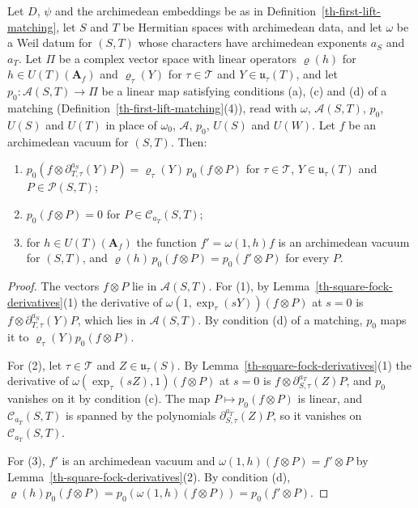 \begin{lemma}\label{th-square-fock-maps}
Let $D$, $\psi$ and the archimedean embeddings be as in
Definition~\ref{th-first-lift-matching}, let $S$ and $T$ be Hermitian spaces
with archimedean data, and let $\omega$ be a Weil datum for $(S,T)$ whose
characters have archimedean exponents $a_S$ and $a_T$. Let $\Pi$ be a complex
vector space with linear operators $\varrho(h)$ for $h\in U(T)(\mathbf A_f)$
and $\varrho_\tau(Y)$ for $\tau\in\mathcal T$ and $Y\in\mathfrak u_\tau(T)$,
and let $p_0\colon\mathcal A(S,T)\to\Pi$ be a linear map satisfying conditions
(a), (c) and (d) of a matching (Definition~\ref{th-first-lift-matching}(4)),
read with $\omega$, $\mathcal A(S,T)$, $p_0$, $U(S)$ and $U(T)$ in place of
$\omega_0$, $\mathcal A$, $p_0$, $U(S)$ and $U(W)$. Let $f$ be an archimedean
vacuum for $(S,T)$. Then:
\begin{enumerate}
\item $p_0(f\otimes\partial^{a_S}_{T,\tau}(Y)P)=\varrho_\tau(Y)\,p_0(f\otimes P)$
  for $\tau\in\mathcal T$, $Y\in\mathfrak u_\tau(T)$ and
  $P\in\mathcal P(S,T)$;
\item $p_0(f\otimes P)=0$ for $P\in\mathcal C_{a_T}(S,T)$;
\item for $h\in U(T)(\mathbf A_f)$ the function $f'=\omega(1,h)f$ is an
  archimedean vacuum for $(S,T)$, and
  $\varrho(h)\,p_0(f\otimes P)=p_0(f'\otimes P)$ for every $P$.
\end{enumerate}
\end{lemma}
\begin{proof}
The vectors $f\otimes P$ lie in $\mathcal A(S,T)$. For (1), by
Lemma~\ref{th-square-fock-derivatives}(1) the derivative of
$\omega(1,\exp_\tau(sY))(f\otimes P)$ at $s=0$ is
$f\otimes\partial^{a_S}_{T,\tau}(Y)P$, which lies in $\mathcal A(S,T)$. By
condition (d) of a matching, $p_0$ maps it to
$\varrho_\tau(Y)p_0(f\otimes P)$.

For (2), let $\tau\in\mathcal T$ and $Z\in\mathfrak u_\tau(S)$. By
Lemma~\ref{th-square-fock-derivatives}(1) the derivative of
$\omega(\exp_\tau(sZ),1)(f\otimes P)$ at $s=0$ is
$f\otimes\partial^{a_T}_{S,\tau}(Z)P$, and $p_0$ vanishes on it by condition
(c). The map $P\mapsto p_0(f\otimes P)$ is linear, and
$\mathcal C_{a_T}(S,T)$ is spanned by the polynomials
$\partial^{a_T}_{S,\tau}(Z)P$, so it vanishes on $\mathcal C_{a_T}(S,T)$.

For (3), $f'$ is an archimedean vacuum and
$\omega(1,h)(f\otimes P)=f'\otimes P$ by
Lemma~\ref{th-square-fock-derivatives}(2). By condition (d),
$\varrho(h)p_0(f\otimes P)=p_0(\omega(1,h)(f\otimes P))=p_0(f'\otimes P)$.
\end{proof}

